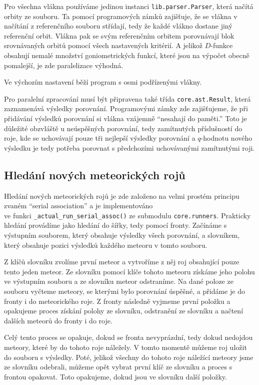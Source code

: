 Pro všechna vlákna používáme jedinou instanci \texttt{lib.parser.Parser}, která načítá orbity ze souboru. Ta pomocí programových zámků zajišťuje, že se vlákna v načítání z referenčního souboru střídají, tedy že každé vlákno dostane jiný referenční orbit. Vlákna pak se svým referenčním orbitem porovnávají blok srovnávaných orbitů pomocí všech nastavených kritérií. A jelikož $D$-funkce obsahují nemalé množství goniometrických funkcí, které jsou na výpočet obecně pomalejší, je zde paralelizace výhodná.

Ve výchozím nastavení běží program s osmi podřízenými vlákny.

\medskip

Pro paralelní zpracování musí být připravena také třída \texttt{core.ast.Result}, která zaznamenává výsledky porovnání. Programovými zámky zde zajišťujeme, že při přidávání výsledků porovnání si vlákna vzájemně "`nesahají do paměti."' Toto je důležité obzvláště u neúspěšných porovnání, tedy zamítnutých příslušností do roje, kde se uchovávají pouze tři nejlepší výsledky porovnání a $q$-hodnotu nového výsledku je tedy potřeba porovnat s předchozími uchovávanými zamítnutými roji.

\subsection{Hledání nových meteorických rojů\label{sec:practical:association}}%
Hledání nových meteorických rojů je zde založeno na velmi prostém principu zvaném "`serial association"' a je implementováno \\ve funkci \texttt{\_actual\_run\_serial\_assoc()} ze submodulu \texttt{core.runners}. Prakticky hledání provádíme jako hledání do šířky, tedy pomocí fronty. Začínáme s výstupním souborem, který obsahuje výsledky všech porovnání, a slovníkem, který obsahuje pozici výsledků každého meteoru v tomto souboru.

Z klíčů slovníku zvolíme první meteor a vytvoříme z něj roj obsahující pouze tento jeden meteor. Ze slovníku pomocí klíče tohoto meteoru získáme jeho polohu ve výstupním souboru a ze slovníku meteor odstraníme. Na dané poloze ze souboru vyčteme meteory, se kterými bylo porovnání úspěšné, a přidáme je do fronty i do meteorického roje. Z fronty následně vyjmeme první položku a opakujeme proces získání polohy ze slovníku, odstranění ze slovníku a načtení dalších meteorů do fronty i do roje.

Celý tento proces se opakuje, dokud se fronta nevyprázdní, tedy dokud nedojdou meteory, které by do tohoto roje náležely. V tomto momentě můžeme roj uložit do souboru s výsledky. Poté, jelikož všechny do tohoto roje náležící meteory jsme ze slovníku odebrali, můžeme opět vybrat první klíč ze slovníku a proces s frontou opakovat. Toto opakujeme, dokud jsou ve slovníku další položky.

